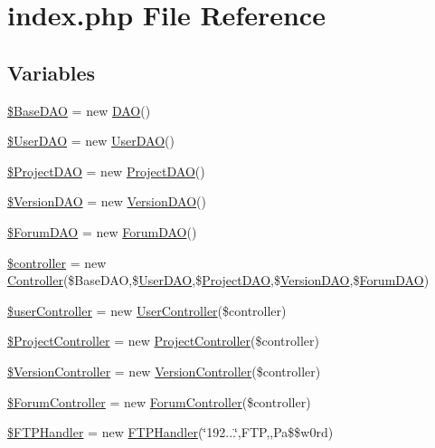 \hypertarget{index_8php}{}\section{index.\+php File Reference}
\label{index_8php}
\subsection*{Variables}
\begin{DoxyCompactItemize}
\item 
\hyperlink{index_8php_aa2e3e5c29ec32d1966f711f65f89d00e}{\$\+Base\+D\+AO} = new \hyperlink{class_d_a_o}{D\+AO}()
\item 
\hyperlink{index_8php_a26fec675c00cd1f892dca678a0ebbd35}{\$\+User\+D\+AO} = new \hyperlink{class_user_d_a_o}{User\+D\+AO}()
\item 
\hyperlink{index_8php_a94ce820c5b5fd29e3663c19ef21aaa78}{\$\+Project\+D\+AO} = new \hyperlink{class_project_d_a_o}{Project\+D\+AO}()
\item 
\hyperlink{index_8php_a6eac754d4e4bdaf48ea5bcd0c98cebcc}{\$\+Version\+D\+AO} = new \hyperlink{class_version_d_a_o}{Version\+D\+AO}()
\item 
\hyperlink{index_8php_a21d57c2c2f509c2d574c0eb5ab72a291}{\$\+Forum\+D\+AO} = new \hyperlink{class_forum_d_a_o}{Forum\+D\+AO}()
\item 
\hyperlink{index_8php_a388ef7b1db5e6f728e63cee704ce6e23}{\$controller} = new \hyperlink{class_controller}{Controller}(\$Base\+D\+AO,\$\hyperlink{class_user_d_a_o}{User\+D\+AO},\$\hyperlink{class_project_d_a_o}{Project\+D\+AO},\$\hyperlink{class_version_d_a_o}{Version\+D\+AO},\$\hyperlink{class_forum_d_a_o}{Forum\+D\+AO})
\item 
\hyperlink{index_8php_ab98c1855a5ef469dd8a4c83ed3b45a88}{\$user\+Controller} = new \hyperlink{class_user_controller}{User\+Controller}(\$controller)
\item 
\hyperlink{index_8php_a34ef9374f9814d7d2aae9c94e3400cad}{\$\+Project\+Controller} = new \hyperlink{class_project_controller}{Project\+Controller}(\$controller)
\item 
\hyperlink{index_8php_ab49685978d0345a6802fd4bb23d009a2}{\$\+Version\+Controller} = new \hyperlink{class_version_controller}{Version\+Controller}(\$controller)
\item 
\hyperlink{index_8php_a157588e4cdd26b15b3e686ca9ee08209}{\$\+Forum\+Controller} = new \hyperlink{class_forum_controller}{Forum\+Controller}(\$controller)
\item 
\hyperlink{index_8php_a4994e178f528f2d5361d991f51055cde}{\$\+F\+T\+P\+Handler} = new \hyperlink{class_f_t_p_handler}{F\+T\+P\+Handler}(\char`\"{}192...\char`\"{},\textquotesingle{}F\+TP\textquotesingle{},\textquotesingle{}\textquotesingle{},\textquotesingle{}Pa\$\$w0rd\textquotesingle{})
\end{DoxyCompactItemize}


